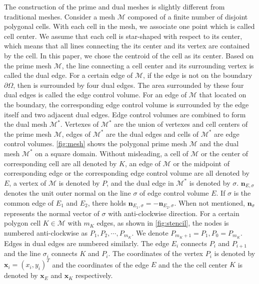 \documentclass[times,review,preprint,authoryear]{elsarticle}
\newcommand{\bx}{\bm{x}}
\newcommand{\bn}{\bm{n}}
\begin{document}
The construction of the prime and dual meshes is slightly different from traditional meshes.
Consider a mesh $\mathcal{M}$ composed of a finite number of disjoint polygonal cells. With each cell in the mesh, we associate one point which is called cell center. We assume that each cell is star-shaped with respect to its center, which means that all lines connecting the its center and its vertex are contained by the cell. In this paper, we chose the centroid of the cell as its center.
Based on the prime mesh $\mathcal{M}$, the line connecting a cell center and its surrounding vertex is called the dual edge. For a certain edge of $\mathcal{M}$, if the edge is not on the boundary $\partial \Omega$, then is surrounded by four dual edges. The area surrounded by these four dual edges is called the edge control volume. For an edge of $\mathcal{M}$ that located on the boundary, the corresponding edge control volume is surrounded by the edge itself and two adjacent dual edges. Edge control volumes are combined to form the dual mesh $\mathcal{M}^*$.
Vertexes of $\mathcal{M}^*$ are the union of vertexes and cell centers of the prime mesh $\mathcal{M}$, edges of $\mathcal{M}^*$ are the dual edges and cells of $\mathcal{M}^*$ are edge control volumes. \cref{fig:mesh} shows the polygonal prime mesh $\mathcal{M}$ and the dual mesh $\mathcal{M}^*$ on a square domain.
Without misleading, a cell of $\mathcal{M}$ or the center of corresponding cell are all denoted by $K$, an edge of $\mathcal{M}$ or the midpoint of corresponding edge or the corresponding edge control volume are all denoted by $E$, a vertex of $\mathcal{M}$ is denoted by $P$, and the dual edge in $\mathcal{M}^*$ is denoted by $\sigma$.
$\bn_{E, \sigma}$ denotes the unit outer normal on the line $\sigma$ of edge control volume $E$. If $\sigma$ is the common edge of $E_1$ and $E_2$, there holds $\bn_{E_1, \sigma} = -\bn_{E_2, \sigma}$. When not mentioned, $\bn_{\sigma}$ represents the normal vector of $\sigma$ with anti-clockwise direction.
For a certain polygon cell $K \in \mathcal{M}$ with $m_K$ edges, as shown in \cref{fig:stencil}, the nodes is numbered anti-clockwise as $P_1, P_2, \cdots, P_{m_K}$. We denote $P_{m_K+1} = P_{1}, P_{0} = P_{m_K}$. Edges in dual edges are numbered similarly. The edge $E_i$ connects $P_{i}$ and $P_{i+1}$ and the line $\sigma_i$ connects $K$ and $P_{i}$.
The coordinates of the vertex $P_i$ is denoted by $\bx_i = (x_i, y_i)^T$ and the coordinates of the edge $E$ and the the cell center $K$ is denoted by $\bx_{E}$ and $\bx_K$ respectively.
\end{document}
